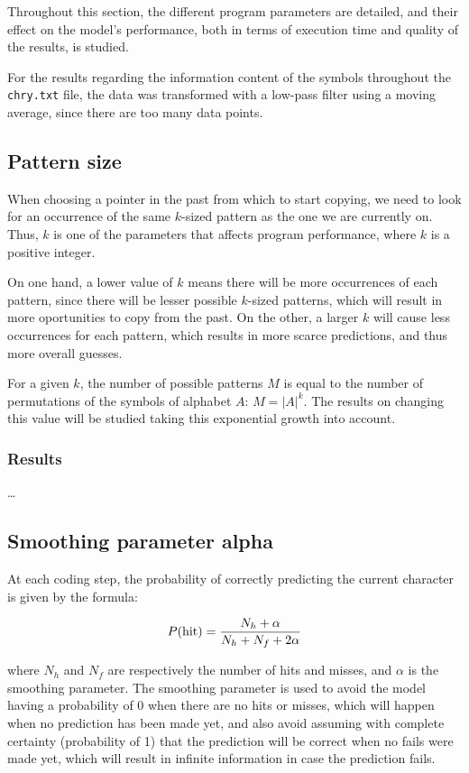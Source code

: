 \documentclass{article}
\begin{document}
Throughout this section, the different program parameters are detailed, and their effect on the model's performance, both in terms of execution time and quality of the results, is studied.

For the results regarding the information content of the symbols throughout the \verb|chry.txt| file, the data was transformed with a low-pass filter using a moving average, since there are too many data points.

\subsection{Pattern size}

When choosing a pointer in the past from which to start copying, we need to look for an occurrence of the same $k$-sized pattern as the one we are currently on.
Thus, $k$ is one of the parameters that affects program performance, where $k$ is a positive integer.

On one hand, a lower value of $k$ means there will be more occurrences of each pattern, since there will be lesser possible $k$-sized patterns, which will result in more oportunities to copy from the past.
On the other, a larger $k$ will cause less occurrences for each pattern, which results in more scarce predictions, and thus more overall guesses.

For a given $k$, the number of possible patterns $M$ is equal to the number of permutations of the symbols of alphabet $A$: $M = \vert A \vert ^ k$.
The results on changing this value will be studied taking this exponential growth into account.

\subsubsection{Results}

\dots

\subsection{Smoothing parameter alpha}

At each coding step, the probability of correctly predicting the current character is given by the formula:

$$
P(\textnormal{hit}) = \frac{N_h + \alpha}{N_h + N_f + 2\alpha}
$$

where $N_h$ and $N_f$ are respectively the number of hits and misses, and $\alpha$ is the smoothing parameter.
The smoothing parameter is used to avoid the model having a probability of 0 when there are no hits or misses, which will happen when no prediction has been made yet, and also avoid assuming with complete certainty (probability of 1) that the prediction will be correct when no fails were made yet, which will result in infinite information in case the prediction fails.
\end{document}
